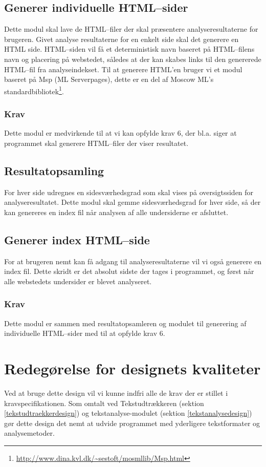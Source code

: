 \documentclass[a4paper,oneside]{memoir}
\begin{document}
\subsection{Generer individuelle HTML--sider}
Dette modul skal lave de HTML--filer der skal præsentere
analyseresultaterne for brugeren. Givet analyse resultaterne for en
enkelt side skal det generere en HTML side. HTML--siden vil få et
deterministisk navn baseret på HTML--filens navn og placering på
webstedet, således at der kan skabes links til den genererede HTML--fil
fra analyseindekset. Til at generere HTML'en bruger vi et modul
baseret på Msp (ML Serverpages), dette er en del af Moscow ML's
standardbibliotek\footnote{\url{http://www.dina.kvl.dk/~sestoft/mosmllib/Msp.html}}.

\subsubsection{Krav}
Dette modul er medvirkende til at vi kan opfylde krav 6, der
bl.a. siger at programmet skal generere HTML--filer der viser
resultatet.

\subsection{Resultatopsamling}
For hver side udregnes en sidesværhedsgrad som skal vises på
oversigtssiden for analyseresultatet. Dette modul skal gemme
sidesværhedsgrad for hver side, så der kan genereres en index fil når
analysen af alle undersiderne er afsluttet.

\subsection{Generer index HTML--side}
For at brugeren nemt kan få adgang til analyseresultaterne vil vi også
generere en index fil. Dette skridt er det absolut sidste der tages i
programmet, og først når alle webstedets undersider er blevet
analyseret.

\subsubsection{Krav}
Dette modul er sammen med resultatopsamleren og modulet til generering
af individuelle HTML--sider med til at opfylde krav 6.

\section{Redegørelse for designets kvaliteter}
Ved at bruge dette design vil vi kunne indfri alle de krav der er
stillet i kravspecifikationen. Som omtalt ved Tekstudtrækkeren
(sektion \ref{tekstudtraekkerdesign}) og tekstanalyse-modulet
(sektion \ref{tekstanalysedesign}) gør dette design det nemt at udvide
programmet med yderligere tekstformater og analysemetoder.
\end{document}
